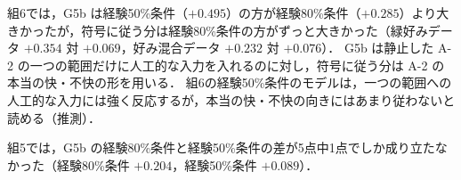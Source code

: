 組6では，G5b は経験50\%条件（$+0.495$）の方が経験80\%条件（$+0.285$）より大きかったが，符号に従う分は経験80\%条件の方がずっと大きかった（緑好みデータ $+0.354$ 対 $+0.069$，好み混合データ $+0.232$ 対 $+0.076$）．
G5b は静止した A-2 の一つの範囲だけに人工的な入力を入れるのに対し，符号に従う分は A-2 の本当の快・不快の形を用いる．
組6の経験50\%条件のモデルは，一つの範囲への人工的な入力には強く反応するが，本当の快・不快の向きにはあまり従わないと読める（推測）．

組5では，G5b の経験80\%条件と経験50\%条件の差が5点中1点でしか成り立たなかった（経験80\%条件 $+0.204$，経験50\%条件 $+0.089$）．
